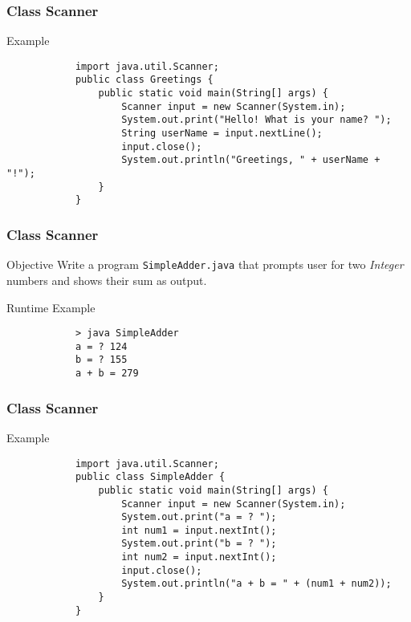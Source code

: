 \documentclass[10pt, compress]{beamer}
\begin{document}
\begin{frame}[fragile]
	\frametitle{Class Scanner}
	\begin{block}{Example}
		\begin{verbatim}
			import java.util.Scanner;
			public class Greetings {
			    public static void main(String[] args) {
			        Scanner input = new Scanner(System.in);
			        System.out.print("Hello! What is your name? ");
			        String userName = input.nextLine();
			        input.close();
			        System.out.println("Greetings, " + userName + "!");
			    }
			}
		\end{verbatim}
	\end{block}
\end{frame}

\begin{frame}[fragile]
	\frametitle{Class Scanner}
	\begin{block}{Objective}
		Write a program \texttt{SimpleAdder.java} that prompts user for two \textit{Integer} numbers and shows their sum as output.
	\end{block}
	\begin{block}{Runtime Example}
		\begin{verbatim}
			> java SimpleAdder
			a = ? 124
			b = ? 155
			a + b = 279
		\end{verbatim}
	\end{block}
\end{frame}

\begin{frame}[fragile]
	\frametitle{Class Scanner}
	\begin{block}{Example}
		\begin{verbatim}
			import java.util.Scanner;
			public class SimpleAdder {
			    public static void main(String[] args) {
			        Scanner input = new Scanner(System.in);
			        System.out.print("a = ? ");
			        int num1 = input.nextInt();
			        System.out.print("b = ? ");
			        int num2 = input.nextInt();
			        input.close();
			        System.out.println("a + b = " + (num1 + num2));
			    }
			}
		\end{verbatim}
	\end{block}
\end{frame}
\end{document}
